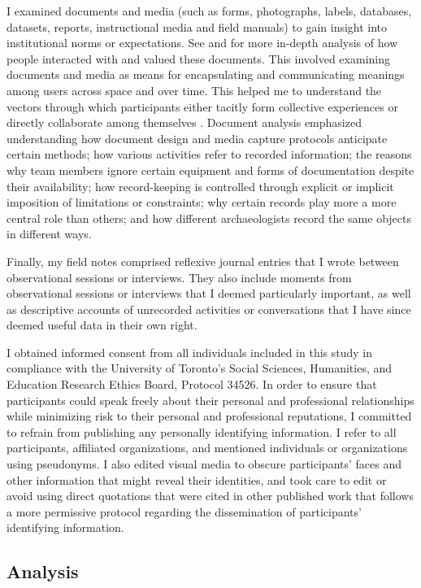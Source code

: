 \documentclass[
]{article}
\begin{document}
I examined documents and media (such as forms, photographs, labels,
databases, datasets, reports, instructional media and field manuals) to
gain insight into institutional norms or expectations. See
\textcite{batist2024} and \textcite{batist-alienation} for more in-depth
analysis of how people interacted with and valued these documents. This
involved examining documents and media as means for encapsulating and
communicating meanings among users across space and over time. This
helped me to understand the vectors through which participants either
tacitly form collective experiences or directly collaborate among
themselves \autocite{huvila2011,huvila2016,yarrow2008}. Document
analysis emphasized understanding how document design and media capture
protocols anticipate certain methods; how various activities refer to
recorded information; the reasons why team members ignore certain
equipment and forms of documentation despite their availability; how
record-keeping is controlled through explicit or implicit imposition of
limitations or constraints; why certain records play more a more central
role than others; and how different archaeologists record the same
objects in different ways.

Finally, my field notes comprised reflexive journal entries that I wrote
between observational sessions or interviews. They also include moments
from observational sessions or interviews that I deemed particularly
important, as well as descriptive accounts of unrecorded activities or
conversations that I have since deemed useful data in their own right.

I obtained informed consent from all individuals included in this study
in compliance with the University of Toronto's Social Sciences,
Humanities, and Education Research Ethics Board, Protocol 34526. In
order to ensure that participants could speak freely about their
personal and professional relationships while minimizing risk to their
personal and professional reputations, I committed to refrain from
publishing any personally identifying information. I refer to all
participants, affiliated organizations, and mentioned individuals or
organizations using pseudonyms. I also edited visual media to obscure
participants' faces and other information that might reveal their
identities, and took care to edit or avoid using direct quotations that
were cited in other published work that follows a more permissive
protocol regarding the dissemination of participants' identifying
information.

\subsection{Analysis}\label{analysis}
\end{document}
